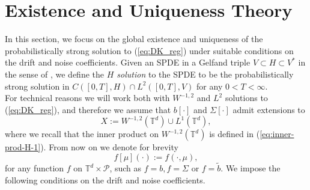 \section{Existence and Uniqueness Theory}\label{ch:GWP}

In this section, we focus on the global existence and uniqueness of the probabilistically strong solution to (\ref{eq:DK_reg}) under suitable conditions on the drift and noise coefficients. Given an SPDE in a Gelfand triple $V \subset H \subset V^{\ast}$ in the sense of \cite{LR15}, we define the \emph{$H$ solution} to the SPDE to be the probabilistically strong solution in $C([0,T],H) \cap L^2([0,T],V)$ for any $0< T < \infty$.\\


For technical reasons we will work both with $W^{-1,2}$ and $L^2$ solutions to (\ref{eq:DK_reg}), and therefore we assume that $b[\cdot]$ and $\Sigma[\cdot]$ admit extensions to
\[
X := W^{-1,2}(\mathbb{T}^d) \cup L^1(\mathbb{T}^d), 
\]
where we recall that the inner product on $W^{-1,2}(\mathbb{T}^d)$ is defined in (\ref{eq:inner-prod-H-1}). 
From now on we denote for brevity
\begin{equation}
    f[\mu](\cdot) := f(\cdot, \mu),
\end{equation}
for any function $f$ on $\mathbb T^d \times \mathcal P$, such as $f=b, f = \Sigma$ or $f=\tilde b$. We impose the following  conditions on the drift and noise coefficients.
